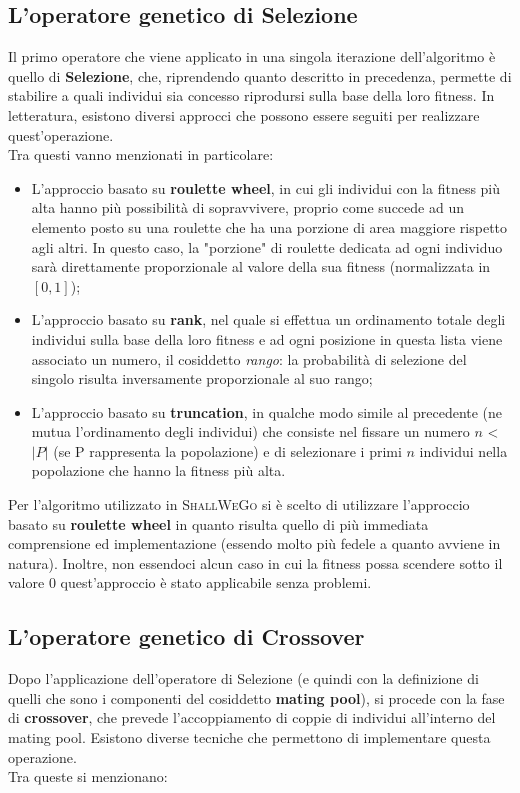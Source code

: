     \subsection{L'operatore genetico di Selezione}
        Il primo operatore che viene applicato in una singola iterazione dell'algoritmo è quello di \textbf{Selezione}, che, riprendendo quanto descritto in precedenza, permette di stabilire a quali individui sia concesso riprodursi sulla base della loro fitness. In letteratura, esistono diversi approcci che possono essere seguiti per realizzare quest'operazione. \\
        Tra questi vanno menzionati in particolare:

        \begin{itemize}
            \item L'approccio basato su \textbf{roulette wheel}, in cui gli individui con la fitness più alta hanno più possibilità di sopravvivere, proprio come succede ad un elemento posto su una roulette che ha una porzione di area maggiore rispetto agli altri. In questo caso, la "porzione" di roulette dedicata ad ogni individuo sarà direttamente proporzionale al valore della sua fitness (normalizzata in $[0, 1]$);
            \item L'approccio basato su \textbf{rank}, nel quale si effettua un ordinamento totale degli individui sulla base della loro fitness e ad ogni posizione in questa lista viene associato un numero, il cosiddetto \textit{rango}: la probabilità di selezione del singolo risulta inversamente proporzionale al suo rango;
            \item L'approccio basato su \textbf{truncation}, in qualche modo simile al precedente (ne mutua l'ordinamento degli individui) che consiste nel fissare un numero $n$ < $|P|$ (se P rappresenta la popolazione) e di selezionare i primi $n$ individui nella popolazione che hanno la fitness più alta.
        \end{itemize}

        Per l'algoritmo utilizzato in \textsc{ShallWeGo} si è scelto di utilizzare l'approccio basato su \textbf{roulette wheel} in quanto risulta quello di più immediata comprensione ed implementazione (essendo molto più fedele a quanto avviene in natura). Inoltre, non essendoci alcun caso in cui la fitness possa scendere sotto il valore $0$ quest'approccio è stato applicabile senza problemi.

    \subsection{L'operatore genetico di Crossover}
        Dopo l'applicazione dell'operatore di Selezione (e quindi con la definizione di quelli che sono i componenti del cosiddetto \textbf{mating pool}), si procede con la fase di \textbf{crossover}, che prevede l'accoppiamento di coppie di individui all'interno del mating pool. 
        Esistono diverse tecniche che permettono di implementare questa operazione. \\
        Tra queste si menzionano:

